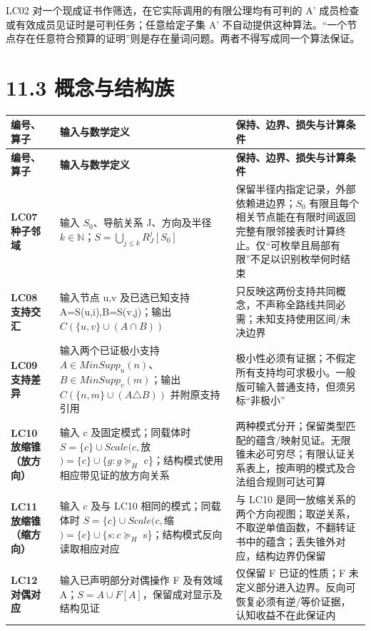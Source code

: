 \documentclass[UTF8,a4paper,zihao=-4,fontset=windows,openany]{ctexbook}
\def\mathrm#1{#1}%
\begin{document}
LC02 对一个现成证书作筛选，在它实际调用的有限公理均有可判的 A' 成员检查或有效成员见证时是可判任务；任意给定子集 A' 不自动提供这种算法。“一个节点存在任意符合预算的证明”则是存在量词问题。两者不得写成同一个算法保证。

\section{11.3 概念与结构族}
\begingroup\small\setlength{\tabcolsep}{4pt}
\begin{longtable}{>{\raggedright\arraybackslash}p{}>{\raggedright\arraybackslash}p{}>{\raggedright\arraybackslash}p{}}
\toprule
\textbf{编号、算子} & \textbf{输入与数学定义} & \textbf{保持、边界、损失与计算条件} \\
\midrule
\endfirsthead
\toprule
\textbf{编号、算子} & \textbf{输入与数学定义} & \textbf{保持、边界、损失与计算条件} \\
\midrule
\endhead
\bottomrule
\endfoot
\bottomrule
\endlastfoot
\textbf{LC07 种子邻域} & 输入 \(S_{0}\)、导航关系 J、方向及半径 \(k\in\mathbb{N}\)；\(S=\bigcup_{j\le k}R_J^j[S_{0}]\) & 保留半径内指定记录，外部依赖进边界；\(S_{0}\) 有限且每个相关节点能在有限时间返回完整有限邻接表时计算终止。仅“可枚举且局部有限”不足以识别枚举何时结束 \\
\textbf{LC08 支持交汇} & 输入节点 u,v 及已选已知支持 A=S(u,i),B=S(v,j)；输出 \(C(\{u,v\}\cup(A\cap B))\) & 只反映这两份支持共同概念，不声称全路线共同必需；未知支持使用区间/未决边界 \\
\textbf{LC09 支持差异} & 输入两个已证极小支持 \(A\in\mathrm{MinSupp}_u(n)\)、\(B\in\mathrm{MinSupp}_v(m)\)；输出 \(C(\{n,m\}\cup(A\triangle B))\) 并附原支持引用 & 极小性必须有证据；不假定所有支持均可求极小。一般版可输入普通支持，但须另标“非极小” \\
\textbf{LC10 放缩锥（放方向）} & 输入 c 及固定模式；同载体时 \(S=\{c\}\cup\mathrm{Scale}(c,\)放\()=\{c\}\cup\{g:g\succeq_H\) c\}；结构模式使用相应带见证的放方向关系 & 两种模式分开；保留类型匹配的蕴含/映射见证。无限锥未必可穷尽；有限认证关系表上，按声明的模式及合法组合规则可达可算 \\
\textbf{LC11 放缩锥（缩方向）} & 输入 c 及与 LC10 相同的模式；同载体时 \(S=\{c\}\cup\mathrm{Scale}(c,\)缩\()=\{c\}\cup\{s:c\succeq_H\) s\}；结构模式反向读取相应对应 & 与 LC10 是同一放缩关系的两个方向视图；取逆关系，不取逆单值函数，不翻转证书中的蕴含；丢失锥外对应，结构边界仍保留 \\
\textbf{LC12 对偶对应} & 输入已声明部分对偶操作 F 及有效域 A；\(S=A\cup F[A]\)，保留成对显示及结构见证 & 仅保留 F 已证的性质；F 未定义部分进入边界。反向可恢复必须有逆/等价证据，认知收益不在此保证内 \\
\end{longtable}
\endgroup
\end{document}
